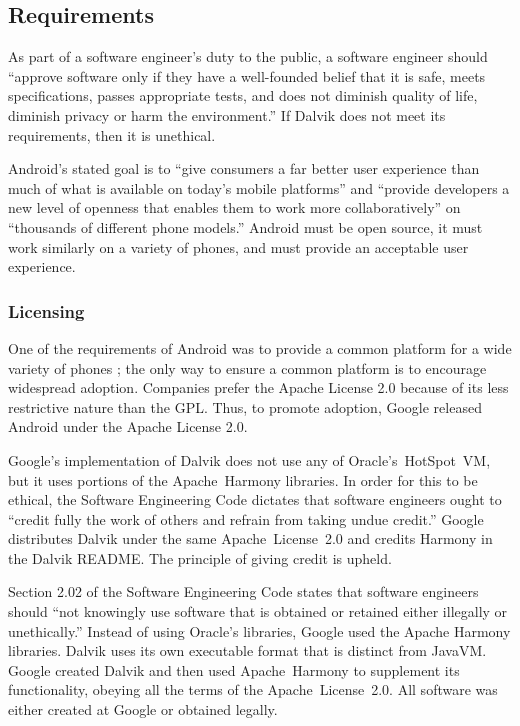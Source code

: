 \documentclass[11pt]{article}
\begin{document}
\begin{multicols}{2}

\subsection{Requirements} %
\label{sub:requirements}

As part of a software engineer's duty to the public, a software engineer should
``approve software only if they have a well-founded belief that it is safe,
meets specifications, passes appropriate tests, and does not diminish quality of
life, diminish privacy or harm the environment.'' \cite[\S~1.03]{secode} If
Dalvik does not meet its requirements, then it is unethical.

Android's stated goal is to ``give consumers a far better user experience than
much of what is available on today's mobile platforms'' and ``provide developers
a new level of openness that enables them to work more collaboratively'' on
``thousands of different phone models.'' \cite{open-handset-alliance-ann}
Android must be open source, it must work similarly on a variety of phones, and
must provide an acceptable user experience.

\subsubsection{Licensing} %
\label{sub:licensing}

One of the requirements of Android was to provide a common platform for a wide
variety of phones \cite{open-handset-alliance-ann}; the only way to ensure a
common platform is to encourage widespread adoption.  Companies prefer the
Apache License 2.0 because of its less restrictive nature than the GPL.
\cite{why-apache2-license}  Thus, to promote adoption, Google released Android
under the Apache License 2.0.

Google's implementation of Dalvik does not use any of Oracle's~HotSpot~VM, but
it uses portions of the Apache~Harmony libraries.  In order for this to be
ethical, the Software Engineering Code dictates that software engineers ought to
``credit fully the work of others and refrain from taking undue credit.''
\cite[\S 7.03]{secode}  Google distributes Dalvik under the same
Apache~License~2.0 and credits Harmony in the Dalvik README.
\cite{dalvik-readme}  The principle of giving credit is upheld.

Section 2.02 of the Software Engineering Code states that software engineers
should ``not knowingly use software that is obtained or retained either
illegally or unethically.'' \cite[\S 2.02]{secode}  Instead of using Oracle's
libraries, Google used the Apache Harmony libraries.  Dalvik uses its own
executable format that is distinct from JavaVM.  Google created Dalvik and then
used Apache~Harmony to supplement its functionality, obeying all the terms of
the Apache~License~2.0.  All software was either created at Google or obtained
legally.


\end{multicols}
\end{document}
